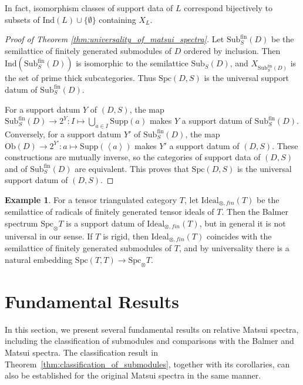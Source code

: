 \documentclass[11pt]{amsart}
\theoremstyle{definition}
\newtheorem{example}[defn]{Example}
\theoremstyle{plain}
\theoremstyle{remark}
\newcommand{\Ind}{\mathrm{Ind}}
\newcommand{\Sub}{\mathrm{Sub}}
\newcommand{\mo}{\mathrm}
\newcommand{\Supp}{\mathrm{Supp}}
\newcommand{\ang}[1]{{\left\langle{#1}\right\rangle}}
\newcommand{\Spc}{\mathrm{Spc}}
\newcommand{\oSpc}{\mathrm{Spc}_{\otimes}}
\numberwithin{equation}{section}
\begin{document}
In fact, isomorphism classes of support data of \(L\) correspond bijectively to subsets of \(\Ind(L)\cup\{\emptyset\}\) containing \(X_L\).

\begin{proof}[Proof of Theorem \ref{thm:universality_of_matsui_spectra}]
Let \(\Sub_{S}^{\mo{fin}}(D)\) be the semilattice of finitely generated submodules of \(D\) ordered by inclusion.
Then \(\Ind(\Sub_{S}^{\mo{fin}}(D))\) is isomorphic to the semilattice \(\Sub_{S}(D)\), and \(X_{\Sub_{S}^{\mo{fin}}(D)}\) is the set of prime thick subcategories.
Thus \(\Spc(D,S)\) is the universal support datum of \(\Sub_{S}^{\mo{fin}}(D)\).

For a support datum \(Y\) of \((D,S)\), the map
\(\Sub_{S}^{\mo{fin}}(D)\to 2^Y: I\mapsto \bigcup_{a\in I}\Supp(a)\) makes \(Y\) a support datum of \(\Sub_{S}^{\mo{fin}}(D)\).
Conversely, for a support datum \(Y'\) of \(\Sub_{S}^{\mo{fin}}(D)\), the map \(\mo{Ob}(D)\to 2^{Y'}: a\mapsto \Supp(\ang{a})\) makes \(Y'\) a support datum of \((D,S)\).
These constructions are mutually inverse, so the categories of support data of \((D,S)\) and of \(\Sub_{S}^{\mo{fin}}(D)\) are equivalent.
This proves that \(\Spc(D,S)\) is the universal support datum of \((D,S)\).
\end{proof} 

\begin{example}
For a tensor triangulated category \(T\), let \(\mo{Ideal}_{\otimes,fin}(T)\) be the semilattice of radicals of finitely generated tensor ideals of \(T\).
Then the Balmer spectrum \(\oSpc T\) is a support datum of \(\mo{Ideal}_{\otimes,fin}(T)\), but in general it is not universal in our sense.
If \(T\) is rigid, then \(\mo{Ideal}_{\otimes,fin}(T)\) coincides with the semilattice of finitely generated submodules of \(T\), and by universality there is a natural embedding \(\Spc(T,T)\to \oSpc T\).
\end{example}







\section{Fundamental Results}\label{section:fundamental_results}
In this section, we present several fundamental results on relative Matsui spectra, including the classification of submodules and comparisons with the Balmer and Matsui spectra.
The classification result in Theorem~\ref{thm:classification_of_submodules}, together with its corollaries, can also be established for the original Matsui spectra in the same manner.
\end{document}
